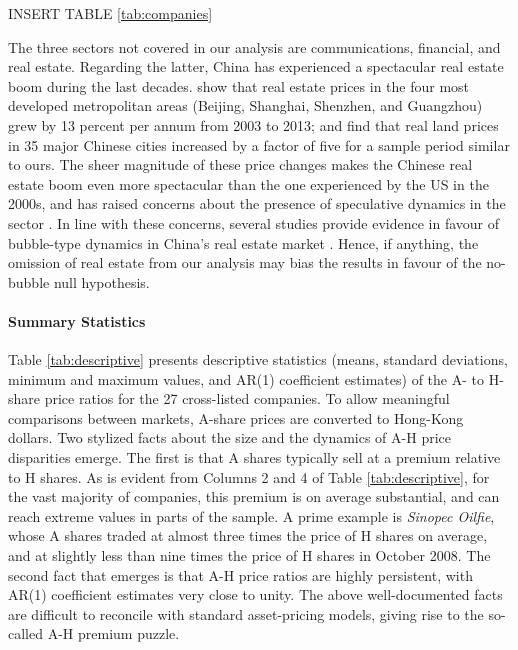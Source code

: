 \documentclass[11pt]{article}
\begin{document}
\bigskip
\begin{center}
INSERT TABLE \ref{tab:companies}
\end{center}
\bigskip


The three sectors not covered in our analysis are communications, financial, and real estate. Regarding the latter, China has experienced a spectacular real estate boom during the last decades. \citet{fangGXZ2016} show that real estate prices in the four most developed metropolitan areas (Beijing, Shanghai, Shenzhen, and Guangzhou) grew by 13 percent per annum from 2003 to 2013; and \citet{wuGD2015} find that real land prices in 35 major Chinese cities increased by a factor of five for a sample period similar to ours. The sheer magnitude of these price changes makes the Chinese real estate boom even more spectacular than the one experienced by the US in the 2000s, and has raised concerns about the presence of speculative dynamics in the sector \citep{glaeserHMS2017,chenW2017}. In line with these concerns, several studies provide evidence in favour of bubble-type dynamics in China's real estate market \citep{zhiLJWS2019,maoS2019}. Hence, if anything, the omission of real estate from our analysis may bias the results in favour of the no-bubble null hypothesis.

\paragraph{Summary Statistics} Table \ref{tab:descriptive} presents descriptive statistics (means, standard deviations, minimum and maximum values, and AR(1) coefficient estimates) of the A- to H-share price ratios for the 27 cross-listed companies. To allow meaningful comparisons between markets, A-share prices are converted to Hong-Kong dollars. Two stylized facts about the size and the dynamics of A-H price disparities emerge. The first is that A shares typically sell at a premium relative to H shares. As is evident from Columns 2 and 4 of Table \ref{tab:descriptive}, for the vast majority of companies, this premium is on average substantial, and can reach extreme values in parts of the sample. A prime example is \textit{Sinopec Oilfie}, whose A shares traded at almost three times the price of H shares on average, and at slightly less than nine times the price of H shares in October 2008. The second fact that emerges is that A-H price ratios are highly persistent, with  AR(1) coefficient estimates very close to unity. The above well-documented facts are difficult to reconcile with standard asset-pricing models, giving rise to the so-called A-H premium puzzle.    
\end{document}
